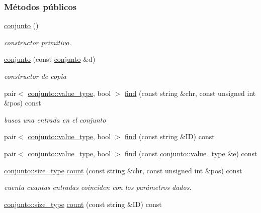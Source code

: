 \subsubsection*{Métodos públicos}
\begin{DoxyCompactItemize}
\item 
\hyperlink{classconjunto_a16d987f42c679efab01748178ba45891}{conjunto} ()
\begin{DoxyCompactList}\small\item\em constructor primitivo. \end{DoxyCompactList}\item 
\hyperlink{classconjunto_ab0944b1f9a0c959ca314ce0debd5def9}{conjunto} (const \hyperlink{classconjunto}{conjunto} \&d)
\begin{DoxyCompactList}\small\item\em constructor de copia \end{DoxyCompactList}\item 
pair$<$ \hyperlink{classconjunto_ad902faf0206fe6aa37e39d8e6e5a880a}{conjunto\+::value\+\_\+type}, bool $>$ \hyperlink{classconjunto_a18090b7e99deb491709f95f038b09258}{find} (const string \&chr, const unsigned int \&pos) const 
\begin{DoxyCompactList}\small\item\em busca una entrada en el conjunto \end{DoxyCompactList}\item 
pair$<$ \hyperlink{classconjunto_ad902faf0206fe6aa37e39d8e6e5a880a}{conjunto\+::value\+\_\+type}, bool $>$ \hyperlink{classconjunto_a1c2e31946fa1481210cc9b6c80de80ea}{find} (const string \&ID) const 
\item 
pair$<$ \hyperlink{classconjunto_ad902faf0206fe6aa37e39d8e6e5a880a}{conjunto\+::value\+\_\+type}, bool $>$ \hyperlink{classconjunto_a3fe1397b6ea109838d28c97e649eebd7}{find} (const \hyperlink{classconjunto_ad902faf0206fe6aa37e39d8e6e5a880a}{conjunto\+::value\+\_\+type} \&e) const 
\item 
\hyperlink{classconjunto_a855a5893bb0f5a851ab2dbf2b8aa6cc7}{conjunto\+::size\+\_\+type} \hyperlink{classconjunto_a08eec66ae9356bea69a3a8e3d6a10694}{count} (const string \&chr, const unsigned int \&pos) const 
\begin{DoxyCompactList}\small\item\em cuenta cuantas entradas coinciden con los parámetros dados. \end{DoxyCompactList}\item 
\hyperlink{classconjunto_a855a5893bb0f5a851ab2dbf2b8aa6cc7}{conjunto\+::size\+\_\+type} \hyperlink{classconjunto_acaed5aea59521f068b4ab510af777e54}{count} (const string \&ID) const 

\end{DoxyCompactItemize}
